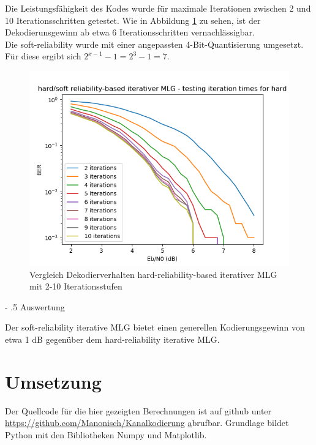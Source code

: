 \documentclass[11pt,a4paper]{article}
\makeatletter
\renewcommand\paragraph{%
\@startsection{paragraph}{4}{0mm}%
{-\baselineskip}%
{.5\baselineskip}%
{\normalfont\normalsize\bfseries}}
\makeatother
\begin{document}
\newpage

Die Leistungsfähigkeit des Kodes wurde für maximale Iterationen zwischen 2 und 10 Iterationsschritten getestet. Wie in Abbildung \ref{fig:iter} zu sehen, ist der Dekodierunsgewinn ab etwa 6 Iterationsschritten vernachlässigbar.\\

Die soft-reliability wurde mit einer angepassten 4-Bit-Quantisierung umgesetzt. Für diese ergibt sich $ 2^{x-1} - 1 = 2^{3} - 1 = 7 $.\\

\begin{figure}[ht]
	\includegraphics[width=\linewidth]{iter.png}
	\caption{Vergleich Dekodierverhalten hard-reliability-based iterativer MLG mit 2-10 Iterationsstufen}
	\label{fig:iter}
\end{figure} 

\paragraph{Auswertung}

Der soft-reliability iterative MLG bietet einen generellen Kodierungsgewinn von etwa 1 dB gegenüber dem hard-reliability iterative MLG.

\section{Umsetzung} Der Quellcode für die hier gezeigten Berechnungen ist auf github unter \url{https://github.com/Manonisch/Kanalkodierung} \href{https://github.com/Manonisch/Kanalkodierung}  abrufbar. Grundlage bildet Python mit den Bibliotheken Numpy und Matplotlib.
\end{document}

